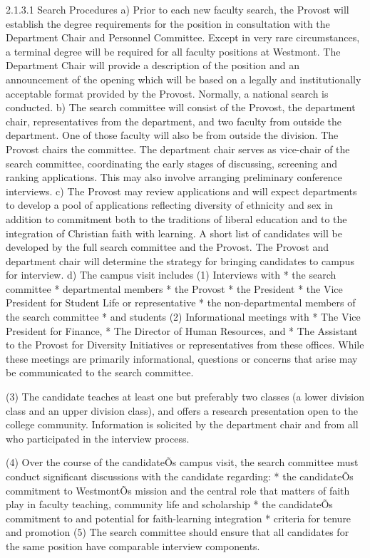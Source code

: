 \documentclass[letterpaper, 11pt]{article}
\begin{document}
	2.1.3.1 Search Procedures
	a)  Prior to each new faculty search, the Provost will establish the degree requirements for the position in consultation with the Department Chair and Personnel Committee. Except in very rare circumstances, a terminal degree will be required for all faculty positions at Westmont.  The Department Chair will provide a description of the position and an announcement of the opening which will be based on a legally and institutionally acceptable format provided by the Provost.  Normally, a national search is conducted.
	b) The search committee will consist of the Provost, the department chair, representatives from the department, and two faculty from outside the department. One of those faculty will also be from outside the division. The Provost chairs the committee. The department chair serves as vice-chair of the search committee, coordinating the early stages of discussing, screening and ranking applications. This may also involve arranging preliminary conference interviews.
	c) The Provost may review applications and will expect departments to develop a pool of applications reflecting diversity of ethnicity and sex in addition to commitment both to the traditions of liberal education and to the integration of Christian faith with learning.  A short list of candidates will be developed by the full search committee and the Provost.  The Provost and department chair will determine the strategy for bringing candidates to campus for interview.
	d)  The campus visit includes
	(1) Interviews with
	* the search committee
	* departmental members
	* the Provost
	* the President
	* the Vice President for Student Life or representative
	* the non-departmental members of the search committee
	* and students
	(2) Informational meetings with
	* The Vice President for Finance,
	* The Director of Human Resources, and
	* The Assistant to the Provost for Diversity Initiatives or representatives from these offices.  While these meetings are primarily informational, questions or concerns that arise may be communicated to the search committee.

	(3) The candidate teaches at least one but preferably two classes (a lower division class and an upper division class), and offers a research presentation open to the college community.  Information is solicited by the department chair and from all who participated in the interview process.

	(4) Over the course of the candidateÕs campus visit, the search committee must conduct significant discussions with the candidate regarding:
	* the candidateÕs commitment to WestmontÕs mission and the central role that matters of faith play in faculty teaching, community life and scholarship
	* the candidateÕs commitment to and potential for faith-learning integration
	* criteria for tenure and promotion
	(5) The search committee should ensure that all candidates for the same position have comparable interview components.
\end{document}
